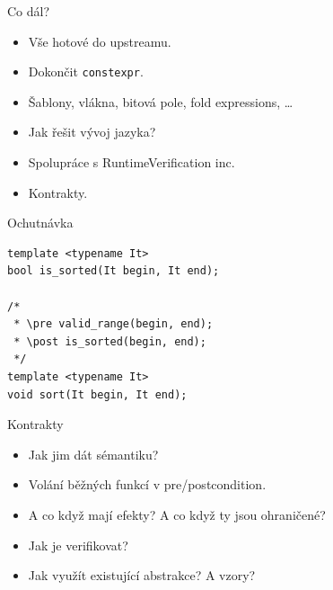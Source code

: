 \documentclass[11pt]{beamer}
\begin{document}
\begin{frame}{Co dál?}
\begin{itemize}
\pause \item Vše hotové do upstreamu.
\pause \item Dokončit \texttt{constexpr}.
\pause \item Šablony, vlákna, bitová pole, fold expressions, \ldots
\pause \item Jak řešit vývoj jazyka?
\pause \item Spolupráce s RuntimeVerification inc.
\pause \item Kontrakty.
\end{itemize}
\end{frame}


\begin{frame}[fragile=singleslide]{Ochutnávka}
\begin{lstlisting}
template <typename It>
bool is_sorted(It begin, It end);

/*
 * \pre valid_range(begin, end);
 * \post is_sorted(begin, end);
 */
template <typename It>
void sort(It begin, It end);
\end{lstlisting}
\end{frame}


\begin{frame}{Kontrakty}
\begin{itemize}
\pause \item Jak jim dát sémantiku?
\pause \item Volání běžných funkcí v pre/postcondition.
\pause \item A co když mají efekty? A co když ty jsou ohraničené?
\pause \item Jak je verifikovat?
\pause \item Jak využít existující abstrakce? A vzory?
\end{itemize}
\end{frame}

\end{document}
